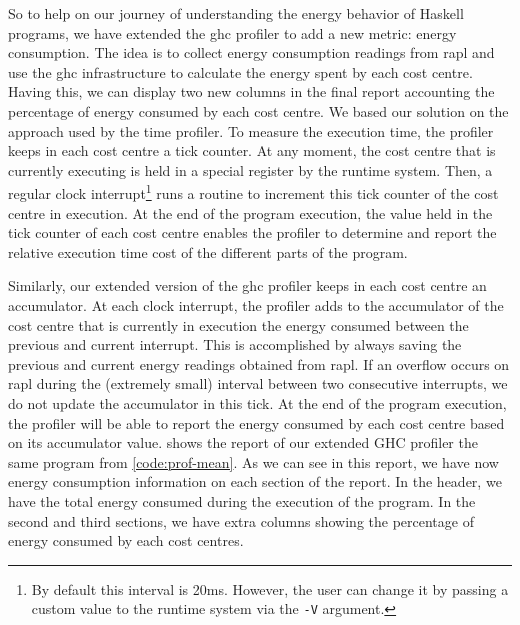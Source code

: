 So to help on our journey of understanding the energy behavior of Haskell programs, we have extended the \ac{ghc} profiler to add a new metric: energy consumption. The idea is to collect energy consumption readings from \ac{rapl} and use the \ac{ghc} infrastructure to calculate the energy spent by each cost centre. Having this, we can display two new columns in the final report accounting the percentage of energy consumed by each cost centre. We based our solution on the approach used by the time profiler. To measure the execution time, the profiler keeps in each cost centre a tick counter. At any moment, the cost centre that is currently executing is held in a special register by the runtime system. Then, a regular clock interrupt\footnote{By default this interval is 20ms. However, the user can change it by passing a custom value to the runtime system via the \texttt{-V} argument.} runs a routine to increment this tick counter of the cost centre in execution. At the end of the program execution, the value held in the tick counter of each cost centre enables the profiler to determine and report the relative execution time cost of the different parts of the program.

Similarly, our extended version of the \ac{ghc} profiler keeps in each cost centre an accumulator. At each clock interrupt, the profiler adds to the accumulator of the cost centre that is currently in execution the energy consumed between the previous and current interrupt. This is accomplished by always saving the previous and current energy readings obtained from \ac{rapl}. If an overflow occurs on \ac{rapl} during the (extremely small) interval between two consecutive interrupts, we do not update the accumulator in this tick. At the end of the program execution, the profiler will be able to report the energy consumed by each cost centre based on its accumulator value.  shows the report of our extended GHC profiler the same program from \autoref{code:prof-mean}. As we can see in this report, we have now energy consumption information on each section of the report. In the header, we have the total energy consumed during the execution of the program. In the second and third sections, we have extra columns showing the percentage of energy consumed by each cost centres.

